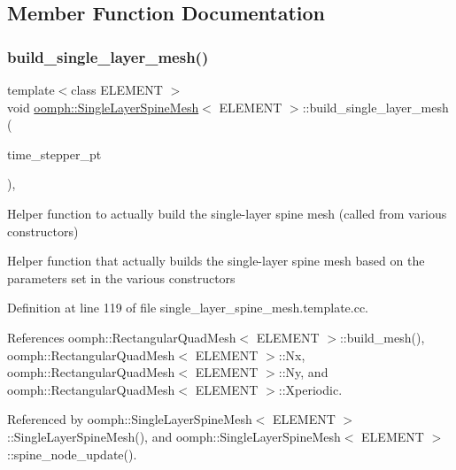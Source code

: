 \subsection{Member Function Documentation}
\mbox{\label{classoomph_1_1SingleLayerSpineMesh_a6829fa8216137c0e2f5eb40b389dda35}} 
\subsubsection{\texorpdfstring{build\+\_\+single\+\_\+layer\+\_\+mesh()}{build\_single\_layer\_mesh()}}
{\footnotesize\ttfamily template$<$class E\+L\+E\+M\+E\+NT $>$ \\
void \hyperlink{classoomph_1_1SingleLayerSpineMesh}{oomph\+::\+Single\+Layer\+Spine\+Mesh}$<$ E\+L\+E\+M\+E\+NT $>$\+::build\+\_\+single\+\_\+layer\+\_\+mesh (\begin{DoxyParamCaption}\item[{Time\+Stepper $\ast$}]{time\+\_\+stepper\+\_\+pt }\end{DoxyParamCaption})\hspace{0.3cm}{\ttfamily [protected]}, {\ttfamily [virtual]}}



Helper function to actually build the single-\/layer spine mesh (called from various constructors) 

Helper function that actually builds the single-\/layer spine mesh based on the parameters set in the various constructors 

Definition at line 119 of file single\+\_\+layer\+\_\+spine\+\_\+mesh.\+template.\+cc.



References oomph\+::\+Rectangular\+Quad\+Mesh$<$ E\+L\+E\+M\+E\+N\+T $>$\+::build\+\_\+mesh(), oomph\+::\+Rectangular\+Quad\+Mesh$<$ E\+L\+E\+M\+E\+N\+T $>$\+::\+Nx, oomph\+::\+Rectangular\+Quad\+Mesh$<$ E\+L\+E\+M\+E\+N\+T $>$\+::\+Ny, and oomph\+::\+Rectangular\+Quad\+Mesh$<$ E\+L\+E\+M\+E\+N\+T $>$\+::\+Xperiodic.



Referenced by oomph\+::\+Single\+Layer\+Spine\+Mesh$<$ E\+L\+E\+M\+E\+N\+T $>$\+::\+Single\+Layer\+Spine\+Mesh(), and oomph\+::\+Single\+Layer\+Spine\+Mesh$<$ E\+L\+E\+M\+E\+N\+T $>$\+::spine\+\_\+node\+\_\+update().

